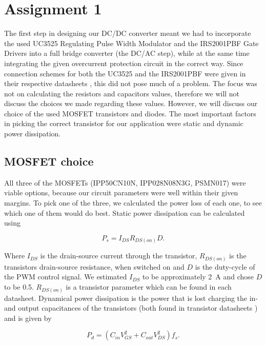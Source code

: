 \documentclass[11pt,titlepage]{report}
\begin{document}
\chapter{Assignment 1}
The first step in designing our DC/DC converter meant we had to incorporate the used UC3525 Regulating Pulse Width Modulator and the IRS2001PBF Gate Drivers into a full bridge converter (the DC/AC step), while at the same time integrating the given overcurrent protection circuit in the correct way. Since connection schemes for both the UC3525 and the IRS2001PBF were given in their respective datasheets \cite{uc3525a-datasheet,irs2001pbf-datasheet}, this did not pose much of a problem. The focus was not on calculating the resistors and capacitors values, therefore we will not discuss the choices we made regarding these values.
However, we will discuss our choice of the used MOSFET transistors and diodes. The most important factors in picking the correct transistor for our application were static and dynamic power dissipation.

\section{MOSFET choice}
All three of the MOSFETs (IPP50CN10N, IPP028N08N3G, PSMN017) were viable options, because our circuit parameters were well within their given margins. To pick one of the three, we calculated the power loss of each one, to see which one of them would do best.
Static power dissipation can be calculated using

\begin{equation}
P_{s} = I_{DS}R_{DS(on)}D .
\end{equation}

Where $I_{DS}$ is the drain-source current through the transistor, $R_{DS(on)}$ is the transistors drain-source resistance, when switched on and $D$ is the duty-cycle of the PWM control signal. We estimated $I_{DS}$ to be approximately \SI{2}{A} and chose $D$ to be \num{0.5}. $R_{DS(on)}$ is a transistor parameter which can be found in each datasheet.
Dynamical power dissipation is the power that is lost charging the in- and output capacitances of the transistors (both found in transistor datasheets \cite{IPP50CN10N-datasheet,IPP028N08N3G-datasheet,PSMN017-datasheet}) and is given by

\begin{equation}
P_{d} = (C_{in}V_{GS}^2 + C_{out}V_{DS}^2)f_{s} .
\end{equation}
\end{document}
